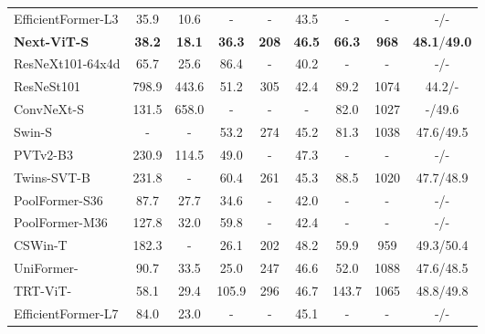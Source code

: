 \documentclass[10pt,twocolumn,letterpaper]{article}
\begin{document}
\begin{table*}[]
{\begin{tabular}{l|cc|ccc|ccc}
    EfficientFormer-L3\cite{li2022efficientformer}      &35.9  & 10.6   & -       & -        & 43.5          & -          & -          & -/-            \\
    \textbf{Next-ViT-S}          &\textbf{38.2}  &\textbf{18.1}      &\textbf{36.3}       & \textbf{208}        & \textbf{46.5}          & \textbf{66.3}      & \textbf{968}       & \textbf{48.1}/\textbf{49.0}      \\ \midrule
    ResNeXt101-64x4d\cite{ResNeXt}   &65.7  & 25.6   & 86.4 &- &40.2       & -          & -          & -/-            \\
    ResNeSt101\cite{zhang2022resnest}    &798.9  &443.6    & 51.2       & 305        & 42.4          & 89.2          & 1074          & 44.2/-            \\
    ConvNeXt-S\cite{ConvNext}                  &131.5  &658.0    & -       & -        & -          & 82.0          & 1027          & -/49.6            \\
    Swin-S\cite{Swin}            &-  &-    & 53.2       & 274        & 45.2          & 81.3       & 1038       & 47.6/49.5      \\
    PVTv2-B3\cite{PVT_v2}        &230.9  &  114.5  &49.0 &- &47.3          & -       & -        & -/-      \\
    Twins-SVT-B\cite{Twins}      &231.8  &-    & 60.4       & 261        & 45.3          & 88.5       & 1020       & 47.7/48.9      \\
    PoolFormer-S36\cite{metaformer}      &87.7    &27.7        & 34.6   & -     & 42.0          & -          & -          & -/-            \\
    PoolFormer-M36\cite{metaformer}      & 127.8   & 32.0       & 59.8  & -      & 42.4          & -          & -          & -/-            \\
    CSWin-T\cite{CSWin}          &182.3  & -   & 26.1       & 202        & 48.2          & 59.9       & 959        & 49.3/50.4      \\
    UniFormer-\cite{uniformer} &90.7  &33.5    & 25.0       & 247        & 46.6          & 52.0     & 1088          & 47.6/48.5            \\
    TRT-ViT-\cite{xia2022trt} &58.1  &29.4    & 105.9       & 296        & 46.7          & 143.7          & 1065          & 48.8/49.8            \\
    EfficientFormer-L7\cite{li2022efficientformer}      &84.0  &23.0    & -       & -        & 45.1          & -          & -          & -/-            \\

\end{tabular}}
\end{table*}
\end{document}
